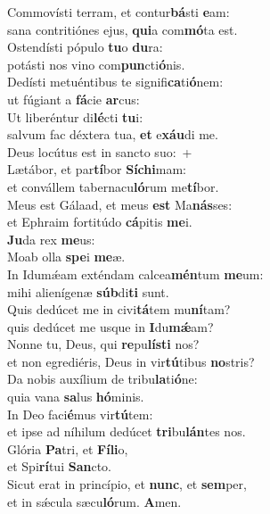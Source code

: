 \evenverse Commovísti terram, et contur\textbf{bá}sti \textbf{e}am:~\*\\
\evenverse sana contritiónes ejus, \textbf{qui}a com\textbf{mó}ta est.\\
\oddverse Ostendísti pópulo \textbf{tu}o \textbf{du}ra:~\*\\
\oddverse potásti nos vino com\textbf{pun}cti\textbf{ó}nis.\\
\evenverse Dedísti metuéntibus te signifi\textbf{ca}ti\textbf{ó}nem:~\*\\
\evenverse ut fúgiant a \textbf{fá}cie \textbf{ar}cus:\\
\oddverse Ut liberéntur di\textbf{lé}cti \textbf{tu}i:~\*\\
\oddverse salvum fac déxtera tua, \textbf{et} e\textbf{xáu}di me.\\
\evenverse Deus locútus est in sancto suo:~+\\
\evenverse  Lætábor, et par\textbf{tí}bor \textbf{Sí}\textbf{chi}mam:~\*\\
\evenverse et convállem tabernacu\textbf{ló}rum me\textbf{tí}bor.\\
\oddverse Meus est Gálaad, et meus \textbf{est} Ma\textbf{nás}ses:~\*\\
\oddverse et Ephraim fortitúdo \textbf{cá}pitis \textbf{me}i.\\
\evenverse \textbf{Ju}da rex \textbf{me}us:~\*\\
\evenverse Moab olla \textbf{spe}i \textbf{me}æ.\\
\oddverse In Idumǽam exténdam calcea\textbf{mén}tum \textbf{me}um:~\*\\
\oddverse mihi alienígenæ \textbf{súb}di\textbf{ti} sunt.\\
\evenverse Quis dedúcet me in civi\textbf{tá}tem mu\textbf{ní}tam?~\*\\
\evenverse quis dedúcet me usque in \textbf{I}du\textbf{mǽ}am?\\
\oddverse Nonne tu, Deus, qui \textbf{re}pu\textbf{lí}\textbf{sti} nos?~\*\\
\oddverse et non egrediéris, Deus in vir\textbf{tú}tibus \textbf{no}stris?\\
\evenverse Da nobis auxílium de tribu\textbf{la}ti\textbf{ó}ne:~\*\\
\evenverse quia vana \textbf{sa}lus \textbf{hó}minis.\\
\oddverse In Deo faci\textbf{é}mus vir\textbf{tú}tem:~\*\\
\oddverse et ipse ad níhilum dedúcet \textbf{tri}bu\textbf{lán}tes nos.\\
\evenverse Glória \textbf{Pa}tri, et \textbf{Fí}\textbf{li}o,~\*\\
\evenverse et Spi\textbf{rí}tui \textbf{San}cto.\\
\oddverse Sicut erat in princípio, et \textbf{nunc}, et \textbf{sem}per,~\*\\
\oddverse et in sǽcula sæcu\textbf{ló}rum. \textbf{A}men.\\
